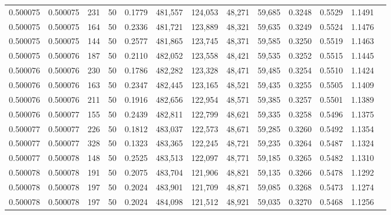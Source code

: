 \begin{tabular}{rrrrrrrrrrrrr}
0.500075 & 0.500075 &   231 &  50 &                                     0.1779 & 481,557 & 124,053 &  48,271 &  59,685 & 0.3248 & 0.5529 & 1.1491 \\
0.500075 & 0.500075 &   164 &  50 &                                     0.2336 & 481,721 & 123,889 &  48,321 &  59,635 & 0.3249 & 0.5524 & 1.1476 \\
0.500075 & 0.500075 &   144 &  50 &                                     0.2577 & 481,865 & 123,745 &  48,371 &  59,585 & 0.3250 & 0.5519 & 1.1463 \\
0.500075 & 0.500076 &   187 &  50 &                                     0.2110 & 482,052 & 123,558 &  48,421 &  59,535 & 0.3252 & 0.5515 & 1.1445 \\
0.500076 & 0.500076 &   230 &  50 &                                     0.1786 & 482,282 & 123,328 &  48,471 &  59,485 & 0.3254 & 0.5510 & 1.1424 \\
0.500076 & 0.500076 &   163 &  50 &                                     0.2347 & 482,445 & 123,165 &  48,521 &  59,435 & 0.3255 & 0.5505 & 1.1409 \\
0.500076 & 0.500076 &   211 &  50 &                                     0.1916 & 482,656 & 122,954 &  48,571 &  59,385 & 0.3257 & 0.5501 & 1.1389 \\
0.500076 & 0.500077 &   155 &  50 &                                     0.2439 & 482,811 & 122,799 &  48,621 &  59,335 & 0.3258 & 0.5496 & 1.1375 \\
0.500077 & 0.500077 &   226 &  50 &                                     0.1812 & 483,037 & 122,573 &  48,671 &  59,285 & 0.3260 & 0.5492 & 1.1354 \\
0.500077 & 0.500077 &   328 &  50 &                                     0.1323 & 483,365 & 122,245 &  48,721 &  59,235 & 0.3264 & 0.5487 & 1.1324 \\
0.500077 & 0.500078 &   148 &  50 &                                     0.2525 & 483,513 & 122,097 &  48,771 &  59,185 & 0.3265 & 0.5482 & 1.1310 \\
0.500078 & 0.500078 &   191 &  50 &                                     0.2075 & 483,704 & 121,906 &  48,821 &  59,135 & 0.3266 & 0.5478 & 1.1292 \\
0.500078 & 0.500078 &   197 &  50 &                                     0.2024 & 483,901 & 121,709 &  48,871 &  59,085 & 0.3268 & 0.5473 & 1.1274 \\
0.500078 & 0.500078 &   197 &  50 &                                     0.2024 & 484,098 & 121,512 &  48,921 &  59,035 & 0.3270 & 0.5468 & 1.1256 \\

\end{tabular}
